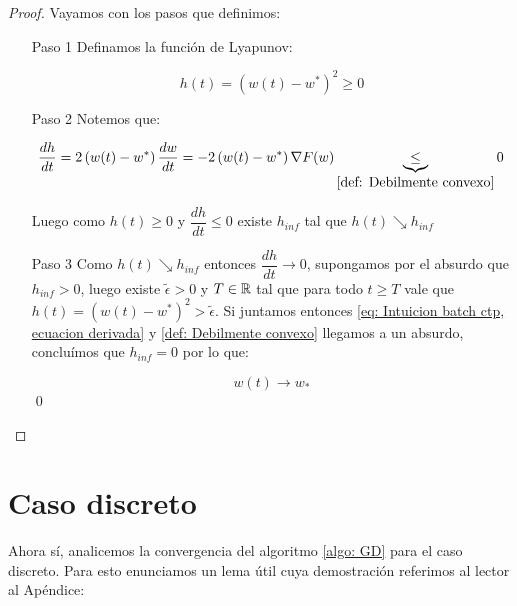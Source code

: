 \begin{proof} Vayamos con los pasos que definimos:
	
	
	\begin{enumerate}
		
		
		\item[Paso 1] Definamos la funci\'on de Lyapunov:
		
		\begin{equation*}
			h(t) = \left(w(t) - w^*\right)^2 \geq 0
		\end{equation*}
		
		\item[Paso 2] Notemos que:
		
		\begin{equation}
		\label{eq: Intuicion batch ctp, ecuacion derivada}
			\dfrac{dh}{dt} = 2 \left(w(t) - w^*\right) \dfrac{dw}{dt} = -2 \left(w(t) - w^*\right) \nabla F(w) \underbrace{\leq}_{\ref{def: Debilmente convexo}} 0
		\end{equation}
		
		Luego como $h(t) \geq 0$ y $\dfrac{dh}{dt} \leq 0$ existe $h_{inf}$ tal que $h(t) \searrow h_{inf}$
		
		\item[Paso 3] Como $h(t) \searrow h_{inf}$ entonces $\dfrac{dh}{dt} \rightarrow 0$, supongamos por el absurdo que $h_{inf} > 0$, luego existe $\widetilde{\epsilon} >0$ y $T \in {\mathbb{R}}$ tal que para todo $t \geq T$ vale que $h(t) = \left(w(t) - w^*\right)^2 > \widetilde{\epsilon}$. Si juntamos entonces \ref{eq: Intuicion batch ctp, ecuacion derivada} y \ref{def: Debilmente convexo} llegamos a un absurdo, conclu\'imos que $h_{inf} = 0$ por lo que:
		
		\begin{equation*}
			w(t) \rightarrow w_*
		\end{equation*}
		\qed
	\end{enumerate}
\end{proof}

\section{Caso discreto}

Ahora s\'i, analicemos la convergencia del algoritmo \ref{algo: GD} para el caso discreto. Para esto enunciamos un lema \'util cuya demostraci\'on referimos al lector al Ap\'endice:

